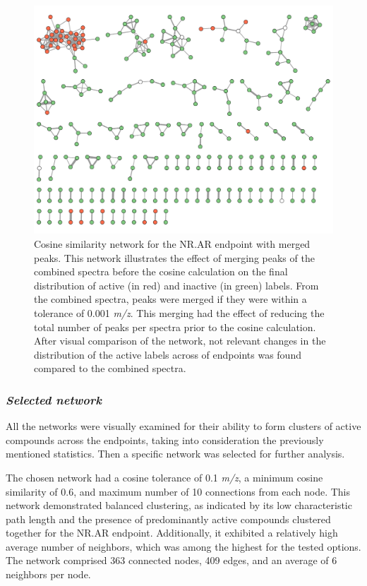 \begin{figure}[h]
  \includegraphics[width=1\textwidth]{include/img/appendix/merged/combined_merge0.001_cosine0.1_cutoff0.6_filtermatches3_edges10topmatches_peakdata.graphml.pdf}
  \caption{Cosine similarity network for the NR.AR endpoint with merged peaks. This network illustrates the effect of merging peaks of the combined spectra before the cosine calculation on the final distribution of active (in red) and inactive (in green) labels. From the combined spectra, peaks were merged if they were within a tolerance of 0.001 \textit{m/z}. This merging had the effect of reducing the total number of peaks per spectra prior to the cosine calculation. After visual comparison of the network, not relevant changes in the distribution of the active labels across of endpoints was found compared to the combined spectra. }
  \label{fig:cosine_merged}
\end{figure}


\subsubsection*{\textit{Selected network}}

All the networks were visually examined for their ability to form clusters of active compounds across the endpoints, taking into consideration the previously mentioned statistics. Then a specific network was selected for further analysis.

The chosen network had a cosine tolerance of 0.1 \textit{m/z}, a minimum cosine similarity of 0.6, and maximum number of 10 connections from each node. This network demonstrated balanced clustering, as indicated by its low characteristic path length and the presence of predominantly active compounds clustered together for the NR.AR endpoint. Additionally, it exhibited a relatively high average number of neighbors, which was among the highest for the tested options. The network comprised 363 connected nodes, 409 edges, and an average of 6 neighbors per node.

